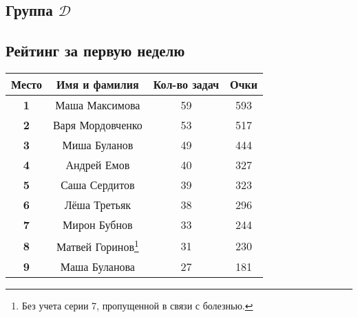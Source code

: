       \begin{center}
      \section*{Группа $\mathcal{D}$}
      \subsection*{Рейтинг за первую неделю}
      \end{center}
      \begin{center}
      \begin{tabular}{ c || c | c | c }
      \bf{Место} & \bf{Имя и фамилия} & \bf{Кол-во задач} & \bf{Очки} \\
      \hline
      \hline
     \bf{1} & Маша Максимова & 59 & 593 \\
     \hline
     \bf{2} & Варя Мордовченко & 53 & 517 \\
     \hline
     \bf{3} & Миша Буланов & 49 & 444 \\
     \hline
     \bf{4} & Андрей Емов & 40 & 327 \\
     \hline
     \bf{5} & Саша Сердитов & 39 & 323 \\
    \hline
     \bf{6} & Лёша Третьяк & 38 & 296 \\
     \hline
     \bf{7} & Мирон Бубнов & 33 & 244\\
      \hline
      \bf{8} & Матвей Горинов\footnote{Без учета серии 7, пропущенной в связи с болезнью. }	& 31 & 230 \\
      \hline
      \bf{9} & Маша Буланова & 27  & 181 \\
      \hline

      \end{tabular}
      \end{center}

